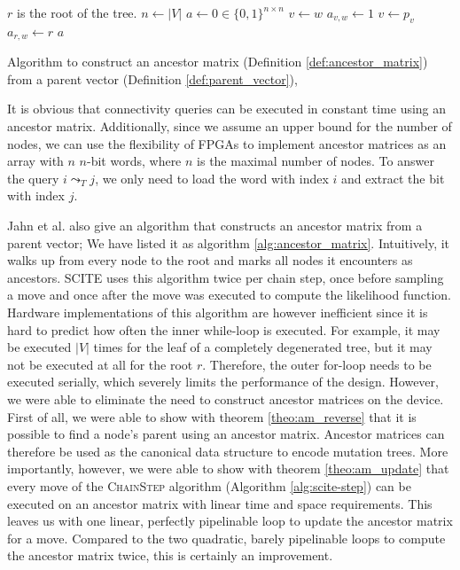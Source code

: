 \begin{algorithm}[p]
    \begin{algorithmic}[1]
         \Comment $r$ is the root of the tree.
            \State $n \leftarrow |V|$
            \State $a \leftarrow 0 \in \{0,1\}^{n \times n}$
                \State $v \leftarrow w$
                    \State $a_{v, w} \leftarrow 1$
                    \State $v \leftarrow p_v$
                \EndWhile
                \State $a_{r, w} \leftarrow r$
            \EndFor
            \State \Return $a$
        \EndFunction
    \end{algorithmic}
    \caption{Algorithm to construct an ancestor matrix (Definition \ref{def:ancestor_matrix}) from a parent vector (Definition \ref{def:parent_vector}), \cite{tree2016}}
    \label{alg:ancestor_matrix}
\end{algorithm}

It is obvious that connectivity queries can be executed in constant time using an ancestor matrix. Additionally, since we assume an upper bound for the number of nodes, we can use the flexibility of \acp{FPGA} to implement ancestor matrices as an array with $n$ $n$-bit words, where $n$ is the maximal number of nodes. To answer the query $i \leadsto_T j$, we only need to load the word with index $i$ and extract the bit with index $j$.

Jahn et al. \cite{tree2016} also give an algorithm that constructs an ancestor matrix from a parent vector; We have listed it as algorithm \ref{alg:ancestor_matrix}. Intuitively, it walks up from every node to the root and marks all nodes it encounters as ancestors. \ac{SCITE} uses this algorithm twice per chain step, once before sampling a move and once after the move was executed to compute the likelihood function. Hardware implementations of this algorithm are however inefficient since it is hard to predict how often the inner while-loop is executed. For example, it may be executed $|V|$ times for the leaf of a completely degenerated tree, but it may not be executed at all for the root $r$. Therefore, the outer for-loop needs to be executed serially, which severely limits the performance of the design. However, we were able to eliminate the need to construct ancestor matrices on the device. First of all, we were able to show with theorem \ref{theo:am_reverse} that it is possible to find a node's parent using an ancestor matrix. Ancestor matrices can therefore be used as the canonical data structure to encode mutation trees. More importantly, however, we were able to show with theorem \ref{theo:am_update} that every move of the \textsc{ChainStep} algorithm (Algorithm \ref{alg:scite-step}) can be executed on an ancestor matrix with linear time and space requirements. This leaves us with one linear, perfectly pipelinable loop to update the ancestor matrix for a move. Compared to the two quadratic, barely pipelinable loops to compute the ancestor matrix twice, this is certainly an improvement.

